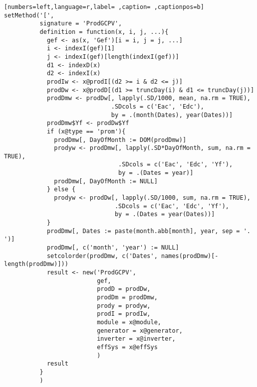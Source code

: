 \begin{lstlisting}[numbers=left,language=r,label= ,caption= ,captionpos=b]
setMethod('[',
          signature = 'ProdGCPV',
          definition = function(x, i, j, ...){
            gef <- as(x, 'Gef')[i = i, j = j, ...] 
            i <- indexI(gef)[1]
            j <- indexI(gef)[length(indexI(gef))]
            d1 <- indexD(x)
            d2 <- indexI(x)
            prodIw <- x@prodI[(d2 >= i & d2 <= j)]
            prodDw <- x@prodD[(d1 >= truncDay(i) & d1 <= truncDay(j))]
            prodDmw <- prodDw[, lapply(.SD/1000, mean, na.rm = TRUE),
                              .SDcols = c('Eac', 'Edc'),
                              by = .(month(Dates), year(Dates))]
            prodDmw$Yf <- prodDw$Yf
            if (x@type == 'prom'){
              prodDmw[, DayOfMonth := DOM(prodDmw)]
              prodyw <- prodDmw[, lapply(.SD*DayOfMonth, sum, na.rm = TRUE),
                                .SDcols = c('Eac', 'Edc', 'Yf'),
                                by = .(Dates = year)]
              prodDmw[, DayOfMonth := NULL]
            } else {
              prodyw <- prodDw[, lapply(.SD/1000, sum, na.rm = TRUE),
                               .SDcols = c('Eac', 'Edc', 'Yf'),
                               by = .(Dates = year(Dates))]
            }
            prodDmw[, Dates := paste(month.abb[month], year, sep = '. ')]
            prodDmw[, c('month', 'year') := NULL]
            setcolorder(prodDmw, c('Dates', names(prodDmw)[-length(prodDmw)]))
            result <- new('ProdGCPV',
                          gef,
                          prodD = prodDw,
                          prodDm = prodDmw,
                          prody = prodyw,
                          prodI = prodIw,
                          module = x@module,
                          generator = x@generator,
                          inverter = x@inverter,
                          effSys = x@effSys
                          )
            result
          }
          )


\end{lstlisting}

